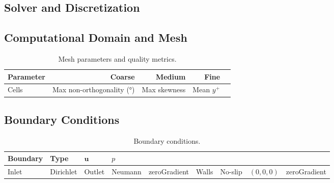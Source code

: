 \documentclass[preprint,12pt]{elsarticle}
\begin{document}
\subsection{Solver and Discretization}


\subsection{Computational Domain and Mesh}


\begin{table}[htbp]
  \centering
  \caption{Mesh parameters and quality metrics.}
  \label{tab:mesh}
  \begin{tabular}{lrrr}
    \toprule
    Parameter & Coarse & Medium & Fine \\
    \midrule
    Cells              & %
    Max non-orthogonality (\si{\degree}) & %
    Max skewness       & %
    Mean $y^+$         & %
    \bottomrule
  \end{tabular}
\end{table}

\subsection{Boundary Conditions}

\begin{table}[htbp]
  \centering
  \caption{Boundary conditions.}
  \label{tab:bc}
  \begin{tabular}{llll}
    \toprule
    Boundary & Type & $\mathbf{u}$ & $p$ \\
    \midrule
    Inlet    & Dirichlet & %
    Outlet   & Neumann   & zeroGradient & %
    Walls    & No-slip   & $(0,0,0)$ & zeroGradient \\
    \bottomrule
  \end{tabular}
\end{table}

\end{document}
